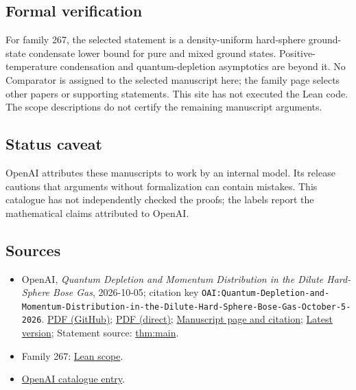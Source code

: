 \documentclass[11pt]{article}
\begin{document}
\subsection{Formal verification}
For family 267, the selected statement is a density-uniform hard-sphere ground-state condensate lower bound for pure and mixed ground states. Positive-temperature condensation and quantum-depletion asymptotics are beyond it. No Comparator is assigned to the selected manuscript here; the family page selects other papers or supporting statements. This site has not executed the Lean code. The scope descriptions do not certify the remaining manuscript arguments.

\subsection{Status caveat}
OpenAI attributes these manuscripts to work by an internal model. Its release cautions that arguments without formalization can contain mistakes. This catalogue has not independently checked the proofs; the labels report the mathematical claims attributed to OpenAI.

\subsection{Sources}
\begin{itemize}
\item OpenAI, \emph{Quantum Depletion and Momentum Distribution in the Dilute Hard-Sphere Bose Gas}, 2026-10-05; citation key \texttt{OAI:Quantum-Depletion-and-Momentum-Distribution-in-the-Dilute-Hard-Sphere-Bose-Gas-October-5-2026}. \href{https://github.com/openai/math/blob/adc7f1241b42e322a6451854ab7e4b4c146bf78a/preprints/Quantum-Depletion-and-Momentum-Distribution-in-the-Dilute-Hard-Sphere-Bose-Gas-October-5-2026/Quantum-Depletion-in-the-Dilute-Hard-Sphere-Bose-Gas.pdf}{PDF (GitHub)}; \href{https://github.com/openai/math/raw/adc7f1241b42e322a6451854ab7e4b4c146bf78a/preprints/Quantum-Depletion-and-Momentum-Distribution-in-the-Dilute-Hard-Sphere-Bose-Gas-October-5-2026/Quantum-Depletion-in-the-Dilute-Hard-Sphere-Bose-Gas.pdf}{PDF (direct)}; \href{https://github.com/openai/math/blob/adc7f1241b42e322a6451854ab7e4b4c146bf78a/preprints/Quantum-Depletion-and-Momentum-Distribution-in-the-Dilute-Hard-Sphere-Bose-Gas-October-5-2026/README.md}{Manuscript page and citation}; \href{https://github.com/openai/math/blob/main/preprints/Quantum-Depletion-and-Momentum-Distribution-in-the-Dilute-Hard-Sphere-Bose-Gas-October-5-2026/Quantum-Depletion-in-the-Dilute-Hard-Sphere-Bose-Gas.pdf}{Latest version}; Statement source: \href{https://github.com/openai/math/blob/adc7f1241b42e322a6451854ab7e4b4c146bf78a/preprints/Quantum-Depletion-and-Momentum-Distribution-in-the-Dilute-Hard-Sphere-Bose-Gas-October-5-2026/build/sections/introduction.tex\#L66}{thm:main}.
\item Family 267: \href{https://github.com/openai/math/blob/adc7f1241b42e322a6451854ab7e4b4c146bf78a/lean/docs/267.md}{Lean scope}.
\item \href{https://github.com/openai/math/blob/adc7f1241b42e322a6451854ab7e4b4c146bf78a/CONTENTS.md}{OpenAI catalogue entry}.
\end{itemize}
\end{document}
